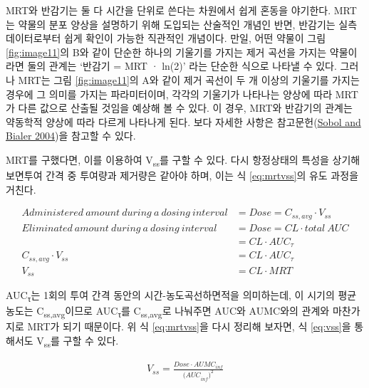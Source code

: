 \documentclass[
  11pt,
  krantz2, a4paper, twoside]{krantz}
\theoremstyle{definition}
\theoremstyle{definition}
\theoremstyle{definition}
\theoremstyle{definition}
\theoremstyle{remark}
\begin{document}
MRT와 반감기는 둘 다 시간을 단위로 쓴다는 차원에서 쉽게 혼동을 야기한다.
MRT는 약물의 분포 양상을 설명하기 위해 도입되는 산술적인 개념인 반면, 반감기는 실측데이터로부터 쉽게 확인이 가능한 직관적인 개념이다.
만일, 어떤 약물이 그림 \ref{fig:image11}의 B와 같이 단순한 하나의 기울기를 가지는 제거 곡선을 가지는 약물이라면 둘의 관계는 `반감기 = MRT · ln(2)' 라는 단순한 식으로 나타낼 수 있다.
그러나 MRT는 그림 \ref{fig:image11}의 A와 같이 제거 곡선이 두 개 이상의 기울기를 가지는 경우에 그 의미를 가지는 파라미터이며, 각각의 기울기가 나타나는 양상에 따라 MRT가 다른 값으로 산출될 것임을 예상해 볼 수 있다.
이 경우, MRT와 반감기의 관계는 약동학적 양상에 따라 다르게 나타나게 된다.
보다 자세한 사항은 참고문헌(\protect\hyperlink{ref-sobol2004relationships}{Sobol and Bialer 2004})을 참고할 수 있다.

MRT를 구했다면, 이를 이용하여 V\textsubscript{ss}를 구할 수 있다. 다시 항정상태의 특성을 상기해 보면투여 간격 중 투여량과 제거량은 같아야 하며, 이는 식 \eqref{eq:mrtvss}의 유도 과정을 거친다.

\small

\begin{equation}
\begin{split}
  Administered\ amount\ during\ a\ dosing\ interval &= Dose = C_{ss,avg} \cdot V_{{ss}} \\
  Eliminated\ amount\ during\ a\ dosing\ interval &= Dose = CL \cdot total\ AUC \\
  \ \  &= CL \cdot AUC_{\tau} \\
  C_{ss,avg} \cdot V_{{ss}} &= CL \cdot AUC_{\tau} \\
  V_{{ss}} &= CL \cdot MRT
\end{split}
\label{eq:mrtvss}
\end{equation}

\normalsize

AUC\textsubscript{τ}는 1회의 투여 간격 동안의 시간-농도곡선하면적을 의미하는데, 이 시기의 평균 농도는 C\textsubscript{ss,avg}이므로 AUC\textsubscript{τ}를 C\textsubscript{ss,avg}로 나눠주면 AUC와 AUMC와의 관계와 마찬가지로 MRT가 되기 때문이다.
위 식 \eqref{eq:mrtvss}을 다시 정리해 보자면, 식 \eqref{eq:vss}을 통해서도 V\textsubscript{ss}를 구할 수 있다.

\begin{equation}
\begin{split}
  V_{ss} = \frac{Dose \cdot AUMC_{inf}}{{{(AUC}_{inf})}^2}
\end{split}
\label{eq:vss}
\end{equation}
\end{document}
